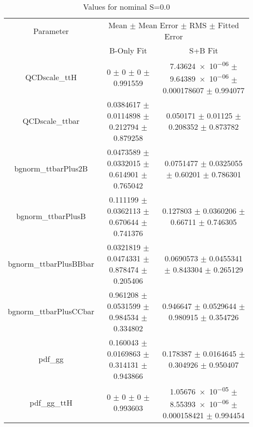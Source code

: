 \begin{table}
\centering
\caption{Values for nominal S=0.0}
\begin{tabular}{ccc}
\toprule
Parameter & \multicolumn{2}{c}{Mean $\pm$ Mean Error $\pm$ RMS $\pm$ Fitted Error}\\
 & B-Only Fit & S+B Fit\\
\midrule
QCDscale\_ttH & \num{0} $\pm$ \num{0} $\pm$ \num{0} $\pm$ \num{0.991559} & \num{7.43624e-06} $\pm$ \num{9.64389e-06} $\pm$ \num{0.000178607} $\pm$ \num{0.994077}\\
QCDscale\_ttbar & \num{0.0384617} $\pm$ \num{0.0114898} $\pm$ \num{0.212794} $\pm$ \num{0.879258} & \num{0.050171} $\pm$ \num{0.01125} $\pm$ \num{0.208352} $\pm$ \num{0.873782}\\
bgnorm\_ttbarPlus2B & \num{0.0473589} $\pm$ \num{0.0332015} $\pm$ \num{0.614901} $\pm$ \num{0.765042} & \num{0.0751477} $\pm$ \num{0.0325055} $\pm$ \num{0.60201} $\pm$ \num{0.786301}\\
bgnorm\_ttbarPlusB & \num{0.111199} $\pm$ \num{0.0362113} $\pm$ \num{0.670644} $\pm$ \num{0.741376} & \num{0.127803} $\pm$ \num{0.0360206} $\pm$ \num{0.66711} $\pm$ \num{0.746305}\\
bgnorm\_ttbarPlusBBbar & \num{0.0321819} $\pm$ \num{0.0474331} $\pm$ \num{0.878474} $\pm$ \num{0.205406} & \num{0.0690573} $\pm$ \num{0.0455341} $\pm$ \num{0.843304} $\pm$ \num{0.265129}\\
bgnorm\_ttbarPlusCCbar & \num{0.961208} $\pm$ \num{0.0531599} $\pm$ \num{0.984534} $\pm$ \num{0.334802} & \num{0.946647} $\pm$ \num{0.0529644} $\pm$ \num{0.980915} $\pm$ \num{0.354726}\\
pdf\_gg & \num{0.160043} $\pm$ \num{0.0169863} $\pm$ \num{0.314131} $\pm$ \num{0.943866} & \num{0.178387} $\pm$ \num{0.0164645} $\pm$ \num{0.304926} $\pm$ \num{0.950407}\\
pdf\_gg\_ttH & \num{0} $\pm$ \num{0} $\pm$ \num{0} $\pm$ \num{0.993603} & \num{1.05676e-05} $\pm$ \num{8.55393e-06} $\pm$ \num{0.000158421} $\pm$ \num{0.994454}\\
\bottomrule
\end{tabular}
\end{table}